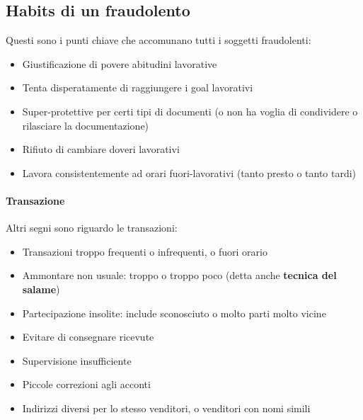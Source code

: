 \subsection{Habits di un fraudolento}

Questi sono i punti chiave che accomunano tutti i soggetti fraudolenti:
\begin{itemize}
	\item Giustificazione di povere abitudini lavorative
	\item Tenta disperatamente di raggiungere i goal lavorativi
	\item Super-protettive per certi tipi di documenti (o non ha voglia di 
	condividere o rilasciare la documentazione)
	\item Rifiuto di cambiare doveri lavorativi
	\item Lavora consistentemente ad orari fuori-lavorativi (tanto presto o tanto 
	tardi)
\end{itemize}

\paragraph*{Transazione}Altri segni sono riguardo le transazioni:
\begin{itemize}
	\item Transazioni troppo frequenti o infrequenti, o fuori orario
	\item Ammontare non usuale: troppo o troppo poco (detta anche 
	\textbf{tecnica del salame})
	\item Partecipazione insolite: include sconosciuto o molto parti molto vicine
	\item Evitare di consegnare ricevute
	\item Supervisione insufficiente
	\item Piccole correzioni agli acconti
	\item Indirizzi diversi per lo stesso venditori, o venditori con nomi simili
\end{itemize}